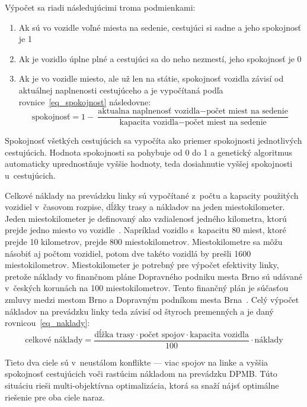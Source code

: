 Výpočet sa riadi následujúcimi troma podmienkami:
\begin{enumerate}
  \item Ak sú vo vozidle voľné miesta na sedenie, cestujúci si sadne a jeho spokojnosť je 1
  \item Ak je vozidlo úplne plné a cestujúci sa do neho nezmestí, jeho spokojnosť je 0
  \item Ak je vo vozidle miesto, ale už len na státie, spokojnosť vozidla závisí od aktuálnej naplnenosti cestujúceho a je vypočítaná podľa rovnice~\ref{eq_spokojnost} následovne: \begin{equation}\label{eq_spokojnost}
      \text{spokojnosť} = 1 - \frac{\text{aktualna naplnenosť vozidla} - \text{počet miest na sedenie}}{\text{kapacita vozidla}  - \text{počet miest na sedenie}}
    \end{equation}
\end{enumerate}
Spokojnosť všetkých cestujúcich sa vypočíta ako priemer spokojnosti jednotlivých cestujúcich.
Hodnota spokojnosti sa pohybuje od 0 do 1 a genetický algoritmus automaticky uprednostňuje vyššie hodnoty, teda dosiahnutie vyššej spokojnosti u~cestujúcich.
\vspace*{\dimexpr0.5\baselineskip\relax}

Celkové náklady na prevádzku linky sú vypočítané z~počtu a kapacity použitých vozidiel v~časovom rozpise, dĺžky trasy a nákladov na jeden miestokilometer.
Jeden miestokilometer je definovaný ako vzdialenosť jedného kilometra, ktorú prejde jedno miesto vo vozidle~\cite{iata_rpks_asks}.
Napríklad vozidlo s~kapacitu 80 miest, ktoré prejde 10 kilometrov, prejde 800 miestokilometrov.
Miestokilometre sa môžu násobiť aj počtom vozidiel, potom dve takéto vozidlá by prešli 1600 miestokilometrov.
Miestokilometer je potrebný pre výpočet efektivity linky, pretože náklady vo finančnom pláne Dopravného podniku mesta Brno sú udávané v~českých korunách na 100 miestokilometrov.
Tento finančný plán je súčasťou zmluvy medzi mestom Brno a Dopravným podníkom mesta Brna~\cite{brno_dpmb_smlouva_2023}.
Celý výpočet nákladov na prevádzku linky teda závisí od štyroch premenných a je daný rovnicou~\ref{eq_naklady}:
\begin{equation}\label{eq_naklady}
  \text{celkové náklady} = \frac{\text{dĺžka trasy} \cdot \text{počet spojov} \cdot \text{kapacita vozidla}}{100} \cdot \text{náklady}
\end{equation}

Tieto dva ciele sú v~neustálom konflikte --- viac spojov na linke a vyššia spokojnosť cestujúcich voči rastúcim nákladom na prevádzku DPMB.
Túto situáciu rieši multi-objektívna optimalizácia, ktorá sa snaží nájsť optimálne riešenie pre oba ciele naraz.

